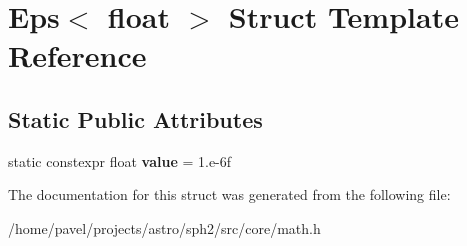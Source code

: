 \hypertarget{structEps_3_01float_01_4}{}\section{Eps$<$ float $>$ Struct Template Reference}
\label{structEps_3_01float_01_4}
\subsection*{Static Public Attributes}
\begin{DoxyCompactItemize}
\item 
\hypertarget{structEps_3_01float_01_4_aa6a3208f7af26cf57f0ad1362afeffcd}{}\label{structEps_3_01float_01_4_aa6a3208f7af26cf57f0ad1362afeffcd} 
static constexpr float {\bfseries value} = 1.e-\/6f
\end{DoxyCompactItemize}


The documentation for this struct was generated from the following file\+:\begin{DoxyCompactItemize}
\item 
/home/pavel/projects/astro/sph2/src/core/math.\+h\end{DoxyCompactItemize}

